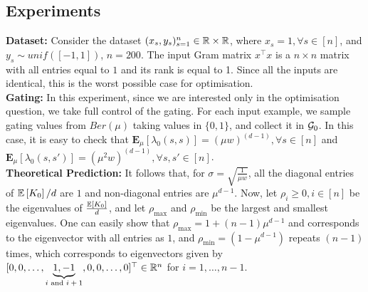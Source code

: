 \subsection{Experiments}
\textbf{Dataset:} Consider the dataset $(x_s,y_s)_{s=1}^n\in \mathbb{R}\times \mathbb{R}$, where $x_s=1,\forall s\in [n]$, and $y_s\sim unif([-1,1])$, $n=200$. The input Gram matrix $x^\top x$ is a $n\times n$ matrix with all entries equal to $1$ and its rank is equal to 1. Since all the inputs are identical, this is the worst possible case for optimisation.\hfill\\
\textbf{Gating:} In this experiment, since we are interested only in the optimisation question, we take full control of the gating. For each input example, we sample gating values from $Ber(\mu)$ taking values in $\{0,1\}$, and collect it in $\mathcal{G}_0$. In this case, it is easy to check that $\mathbf{E}_{\mu}\left[\lambda_0(s,s)\right]=(\mu w)^{(d-1)},\forall s\in[n]$ and $\mathbf{E}_{\mu}\left[\lambda_0(s,s')\right]=(\mu^2 w)^{(d-1)},\forall s,s'\in[n]$.\hfill\\
\textbf{Theoretical Prediction:} It follows that,  for $\sigma=\sqrt{\frac{1}{\mu w}}$, all the diagonal entries of $\mathbb{E}\left[K_0\right]/d$ are $1$ and non-diagonal entries are $\mu^{d-1}$. Now, let $\rho_i\geq 0,i \in [n]$ be the eigenvalues of $\frac{\mathbb{E}\left[K_0\right]}{d}$, and let $\rho_{\max}$ and $\rho_{\min}$ be the largest and smallest eigenvalues.  One can easily show that $\rho_{\max}=1+(n-1)\mu^{d-1}$ and corresponds to the eigenvector with all entries as $1$, and $\rho_{\min}=(1-\mu^{d-1})$ repeats $(n-1)$ times, which corresponds to eigenvectors given by $[0, 0, \ldots, \underbrace{1, -1}_{\text{$i$ and $i+1$}}, 0,0,\ldots, 0]^\top \in \mathbb{R}^n$ for $i=1,\ldots,n-1$.

